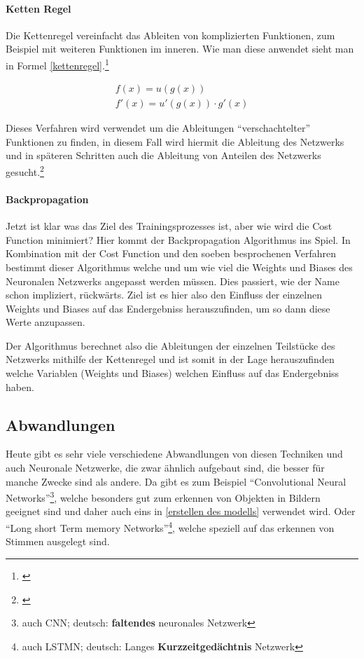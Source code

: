 \paragraph{Ketten Regel}\label{parachain}

Die Kettenregel vereinfacht das Ableiten von komplizierten Funktionen, zum Beispiel mit weiteren Funktionen im inneren. Wie man diese anwendet sieht man in Formel \ref{kettenregel}.\footnote{\cite{kettenregel}}

\begin{equation}\label{kettenregel}
    \begin{matrix}
        f(x) = u(g(x)) \\
        f'(x) = u'(g(x)) \cdot g'(x)
    \end{matrix}
\end{equation}

Dieses Verfahren wird verwendet um die Ableitungen "`verschachtelter"' Funktionen zu finden, in diesem Fall wird hiermit die Ableitung des Netzwerks und in späteren Schritten auch die Ableitung von Anteilen des Netzwerks gesucht.\footnote{\cite{chainruleml}}

\paragraph{Backpropagation}\label{backprop}

Jetzt ist klar was das Ziel des Trainingsprozesses ist, aber wie wird die Cost Function minimiert? Hier kommt der Backpropagation Algorithmus ins Spiel. In Kombination mit der Cost Function und den soeben besprochenen Verfahren bestimmt dieser Algorithmus welche und um wie viel die Weights und Biases des Neuronalen Netzwerks angepasst werden müssen. Dies passiert, wie der Name schon impliziert, rückwärts. Ziel ist es hier also den Einfluss der einzelnen Weights und Biases auf das Endergebniss herauszufinden, um so dann diese Werte anzupassen.

Der Algorithmus berechnet also die Ableitungen der einzelnen Teilstücke des Netzwerks mithilfe der Kettenregel und ist somit in der Lage herauszufinden welche Variablen (Weights und Biases) welchen Einfluss auf das Endergebniss haben.

\subsection{Abwandlungen}

Heute gibt es sehr viele verschiedene Abwandlungen von diesen Techniken und auch Neuronale Netzwerke, die zwar ähnlich aufgebaut sind, die besser für manche Zwecke sind als andere. Da gibt es zum Beispiel "`Convolutional Neural Networks"'\footnote{auch CNN; deutsch: \textbf{faltendes} neuronales Netzwerk}, welche besonders gut zum erkennen von Objekten in Bildern geeignet sind und daher auch eins in \ref{erstellen des modells} verwendet wird. Oder "`Long short Term memory Networks"'\footnote{auch LSTMN; deutsch: Langes \textbf{Kurzzeitgedächtnis} Netzwerk}, welche speziell auf das erkennen von Stimmen ausgelegt sind.

